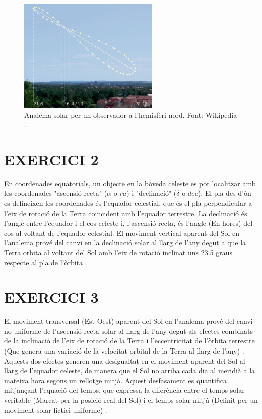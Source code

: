 \documentclass[a4paper, 11pt]{article}
\begin{document}
\begin{figure}[h!]
    \centering
    \includegraphics[width=0.6\textwidth]{images/analema.png}
    \caption{Analema solar per un observador a l'hemisfèri nord. Font: Wikipedia \cite{DEFINICIO_ANALEMA}.}
    \label{fig:analema}
\end{figure}



\section*{EXERCICI 2}
\noindent  En coordenades equatorials, un objecte en la bòveda celeste es pot localitzar amb les coordenades "ascensió recta" ($\alpha$ o $ra$) i "declinació" ($\delta$ o $dec$). El pla des d'ón es defineixen les coordenades és l'equador celestial, que és el pla perpendicular a l'eix de rotació de la Terra coincident amb l'equador terrestre. La declinació és l'angle entre l'equador i el cos celeste i, l'ascensió recta, és l'angle (En hores) del cos al voltant de l'equador celestial. El moviment vertical aparent del Sol en l'analema prové del canvi en la declinació solar al llarg de l'any degut a que la Terra orbita al voltant del Sol amb l'eix de rotació inclinat uns 23.5 graus respecte al pla de l'òrbita \cite{ANALEMA_WIKI}.
\vspace{5mm}


\section*{EXERCICI 3}
\noindent El moviment transversal (Est-Oest) aparent del Sol en l'analema prové del canvi no uniforme de l'ascensió recta solar al llarg de l'any degut als efectes combinats de la inclinació de l'eix de rotació de la Terra i l'eccentricitat de l'òrbita terrestre (Que genera una variació de la velocitat orbital de la Terra al llarg de l'any) \cite{ANALEMA_WIKI}. Aquests dos efectes generen una desigualtat en el moviment aparent del Sol al llarg de l’equador celeste, de manera que el Sol no arriba cada dia al meridià a la mateixa hora segons un rellotge mitjà. Aquest desfasament es quantifica mitjançant l’equació del temps, que expressa la diferència entre el temps solar veritable (Marcat per la posició real del Sol) i el temps solar mitjà (Definit per un moviment solar fictici uniforme) \cite{EQ_OF_TIME}.
\vspace{5mm}
\end{document}
